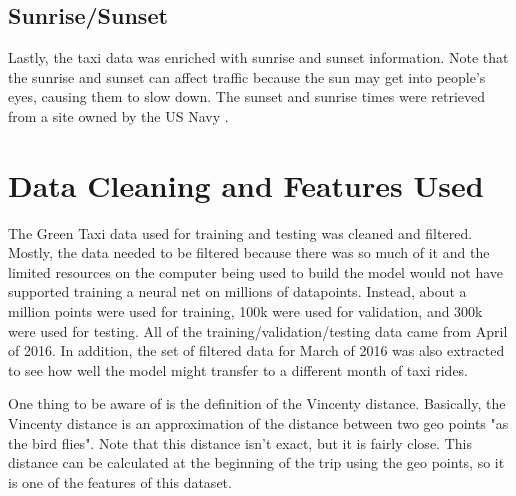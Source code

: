 \documentclass[conference]{IEEEtran}
\begin{document}
\subsection{Sunrise/Sunset}
Lastly, the taxi data was enriched with sunrise and sunset information.  Note that the sunrise and sunset can affect traffic because the sun may get into people's eyes, causing them to slow down.  The sunset and sunrise times were retrieved from a site owned by the US Navy \cite{sun}.


\section{Data Cleaning and Features Used}
The Green Taxi data used for training and testing was cleaned and filtered.  Mostly, the data needed to be filtered because there was so much of it and the limited resources on the computer being used to build the model would not have supported training a neural net on millions of datapoints.  Instead, about a million points were used for training, 100k were used for validation, and 300k were used for testing.  All of the training/validation/testing data came from April of 2016. In addition, the set of filtered data  for March of 2016 was also extracted to see how well the model might transfer to a different month of taxi rides.

One thing to be aware of is the definition of the Vincenty distance.  Basically, the Vincenty distance is an approximation of the distance between two geo points "as the bird flies".  Note that this distance isn't exact, but it is fairly close.  This distance can be calculated at the beginning of the trip using the geo points, so it is one of the features of this dataset.
\end{document}
